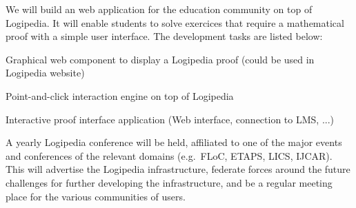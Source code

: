 \begin{workpackage}[id=dissemination,type=MGT,wphases=1-48,
  short={Dissemination},
  title={Dissemination, communication and exploitation},
  lead=Lie,LieRM=1,InrRM=6,BirRM=4,CleRM=2,ImtRM=2,StrRM=2,ZibRM=14,EduRM=12]
\begin{tasklist}
  \begin{task}[id=edukera,
      title=Web teaching interface for doing proofs at school,
      shorttitle=Teach.,
      lead=Edu,EduRM=12,wphases=12-23]
    We will build an web application for the education community on top of Logipedia. It will enable students to solve exercices that require
    a mathematical proof with a simple user interface.
    The development tasks are listed below:
    \begin{compactitem}
    \item Graphical web component to display a Logipedia proof (could be used in Logipedia website)
    \item Point-and-click interaction engine on top of Logipedia
    \item Interactive proof interface application (Web interface, connection to LMS, ...)
    \end{compactitem}
  \end{task}

  \begin{task}[id=dissem,
      title=Dissemination,
      shorttitle=Dissem.,
      lead=Lie,LieRM=1,wphases=1-48]

    A yearly Logipedia conference will be held, affiliated to one of the major
    events and conferences of the relevant domains (e.g.\ FLoC, ETAPS, LICS,
    IJCAR).  This will advertise the Logipedia infrastructure, federate forces
    around the future challenges for further developing the infrastructure, and
    be a regular meeting place for the various communities of users.


  \end{task}

  
\end{tasklist}

\begin{wpdelivs}



\end{wpdelivs}
\end{workpackage}
